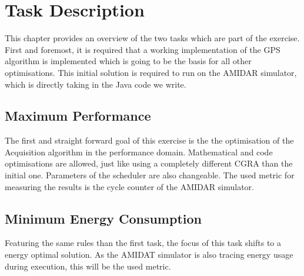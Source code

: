 \chapter{Task Description}
\label{cha:task}
	This chapter provides an overview of the two tasks which are part of the exercise.
	First and foremost, it is required that a working implementation of the GPS algorithm is implemented which is going to be the basis for all other optimisations. This initial solution is required to run on the AMIDAR simulator, which is directly taking in the Java code we write.

	\section{Maximum Performance} %
	\label{sec:task_max_perf}
		The first and straight forward goal of this exercise is the the optimisation of the Acquisition algorithm in the performance domain. Mathematical and code optimisations are allowed, just like using a completely different CGRA than the initial one. Parameters of the scheduler are also changeable.
		The used metric for measuring the results is the cycle counter of the AMIDAR simulator.

	\section{Minimum Energy Consumption} %
	\label{sec:task_min_energy}
		Featuring the same rules than the first task, the focus of this task shifts to a energy optimal solution. As the AMIDAT simulator is also tracing energy usage during execution, this will be the used metric.
